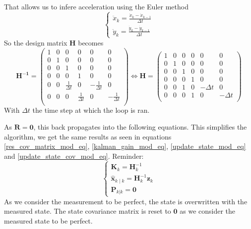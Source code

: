 \documentclass[12pt]{article}
\begin{document}
That allows us to infere acceleration using the Euler method
\begin{equation}
\left\{
    \begin{array}{l}
    \ddot{x}_k = \frac{\dot{x}_k - \dot{x}_{k-1}}{\Delta{t}} \\
    \ddot{y}_k = \frac{\dot{y}_k - \dot{y}_{k-1}}{\Delta{t}}
    \end{array}
\right.
\end{equation}
So the design matrix $\mathbf{H}$ becomes
\begin{equation}
\mathbf{H^{-1}} =
    \begin{pmatrix}
        1 & 0 & 0 & 0 & 0 & 0 \\
        0 & 1 & 0 & 0 & 0 & 0 \\
        0 & 0 & 1 & 0 & 0 & 0 \\
        0 & 0 & 0 & 1 & 0 & 0 \\
        0 & 0 & \frac{1}{\Delta{t}} & 0 & -\frac{1}{\Delta{t}} & 0 \\
        0 & 0 & 0 & \frac{1}{\Delta{t}} & 0 & -\frac{1}{\Delta{t}} \\
    \end{pmatrix}
\iff
\mathbf{H} =
    \begin{pmatrix}
        1 & 0 & 0 & 0 & 0 & 0 \\
        0 & 1 & 0 & 0 & 0 & 0 \\
        0 & 0 & 1 & 0 & 0 & 0 \\
        0 & 0 & 0 & 1 & 0 & 0 \\
        0 & 0 & 1 & 0 & -\Delta{t} & 0 \\
        0 & 0 & 0 & 1 & 0 & -\Delta{t} \\
    \end{pmatrix}
\end{equation}
With $\Delta{t}$ the time step at which the loop is ran.

As $\mathbf{R} = \mathbf{0}$, this back propagates into the following equations.
This simplifies the algorithm, we get the same results as seen in equations \ref{res_cov_matrix_mod_eq}, \ref{kalman_gain_mod_eq}, \ref{update_state_mod_eq} and \ref{update_state_cov_mod_eq}.
Reminder:
\begin{equation}
\left\{
    \begin{array}{l}
    \mathbf{K}_k = \mathbf{H}_k^{-1} \\
    \hat{\mathbf{x}}_{k\mid k} = \mathbf{H}_k^{-1}\mathbf{z}_k \\
    \mathbf{P}_{k|k} = \mathbf{0}
    \end{array}
\right.
\end{equation}
As we consider the measurement to be perfect, the state is overwritten with the measured state.
The state covariance matrix is reset to $\mathbf{0}$ as we consider the measured state to be perfect.
\end{document}
